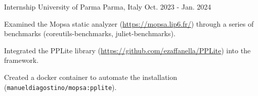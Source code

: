 \begin{cventries}
	\cventry
	{Internship} %
	{University of Parma} %
	{Parma, Italy} %
	{Oct. 2023 - Jan. 2024} %
	{
	\begin{cvitems} %
		\item {Examined the Mopsa static analyzer (\url{https://mopsa.lip6.fr/}) through a series of benchmarks (coreutils-benchmarks, juliet-benchmarks).}
		\item {Integrated the PPLite library (\url{https://github.com/ezaffanella/PPLite}) into the framework.}
		\item {Created a docker container to automate the installation (\texttt{manueldiagostino/mopsa:pplite}).}
	\end{cvitems}
	}

\end{cventries}
